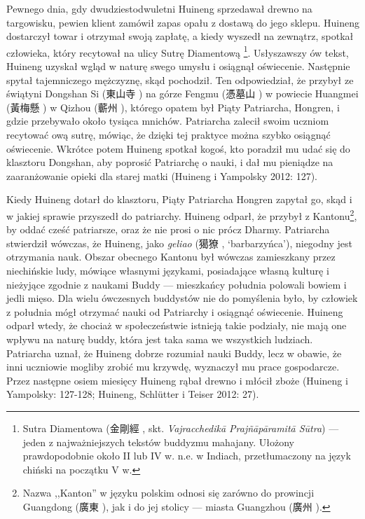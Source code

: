Pewnego dnia, gdy dwudziestodwuletni Huineng sprzedawał drewno na targowisku, pewien klient zamówił zapas opału z dostawą do jego sklepu.
Huineng dostarczył towar i otrzymał swoją zapłatę, a kiedy wyszedł na zewnątrz, spotkał człowieka, który recytował na ulicy Sutrę Diamentową%
\footnote{Sutra Diamentowa (金剛經 , skt. \textit{Vajracchedikā Prajñāpāramitā Sūtra}) --- jeden z najważniejszych tekstów buddyzmu mahajany. Ułożony prawdopodobnie około II lub IV w. n.e. w Indiach, przetłumaczony na język chiński na początku V w.}.\label{DiamondSutra}
Usłyszawszy ów tekst, Huineng uzyskał wgląd w naturę swego umysłu i osiągnął oświecenie. Następnie spytał tajemniczego mężczyznę, skąd pochodził.
Ten odpowiedział, że przybył ze świątyni Dongshan Si (東山寺 ) na górze Fengmu (憑墓山 ) w powiecie Huangmei (黃梅懸 ) w Qizhou (蘄州 ), którego opatem był Piąty Patriarcha, Hongren, i gdzie przebywało około tysiąca mnichów.
Patriarcha zalecił swoim uczniom recytować ową sutrę, mówiąc, że dzięki tej praktyce można szybko osiągnąć oświecenie.
Wkrótce potem Huineng spotkał kogoś, kto poradził mu udać się do klasztoru Dongshan, aby poprosić Patriarchę o nauki, i dał mu pieniądze na zaaranżowanie opieki dla starej matki
(Huineng i Yampolsky 2012: 127).

Kiedy Huineng dotarł do klasztoru, Piąty Patriarcha Hongren zapytał go, skąd i w jakiej sprawie przyszedł do patriarchy.
Huineng odparł, że przybył z Kantonu\footnote{Nazwa ,,Kanton'' w języku polskim odnosi się zarówno do prowincji Guangdong (廣東 ), jak i do jej stolicy --- miasta Guangzhou (廣州 ).}, by oddać cześć patriarsze, oraz że nie prosi o nic prócz Dharmy.
Patriarcha stwierdził wówczas, że Huineng, jako \textit{geliao} (獦獠 , `barbarzyńca'), niegodny jest otrzymania nauk.
Obszar obecnego Kantonu był wówczas zamieszkany przez niechińskie ludy, mówiące własnymi językami, posiadające własną kulturę i nieżyjące zgodnie z naukami Buddy --- mieszkańcy południa polowali bowiem i jedli mięso.
Dla wielu ówczesnych buddystów nie do pomyślenia było, by człowiek z południa mógł otrzymać nauki od Patriarchy i osiągnąć oświecenie.
Huineng odparł wtedy, że chociaż w społeczeństwie istnieją takie podziały, nie mają one wpływu na naturę buddy, która jest taka sama we wszystkich ludziach.
Patriarcha uznał, że Huineng dobrze rozumiał nauki Buddy, lecz w obawie, że inni uczniowie mogliby zrobić mu krzywdę, wyznaczył mu prace gospodarcze.
Przez następne osiem miesięcy Huineng rąbał drewno i młócił zboże
(Huineng i Yampolsky: 127-128; Huineng, Schlütter i Teiser 2012: 27).


